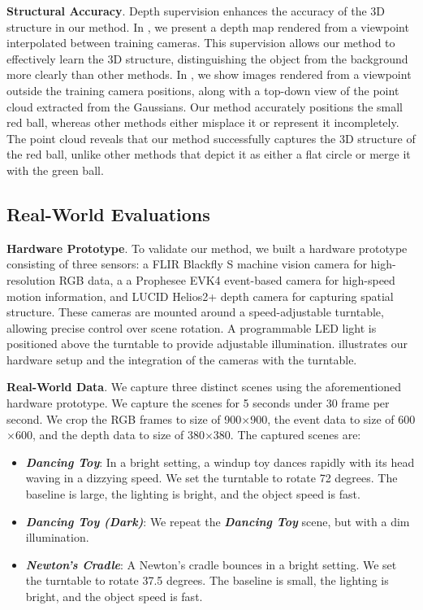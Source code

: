 

\noindent
\textbf{Structural Accuracy}. Depth supervision enhances the accuracy of the 3D structure in our method. In \figureautorefname{~\ref{fig:depth}}, we present a depth map rendered from a viewpoint interpolated between training cameras. This supervision allows our method to effectively learn the 3D structure, distinguishing the object from the background more clearly than other methods. In \figureautorefname{~\ref{fig:extrapolate}}, we show images rendered from a viewpoint outside the training camera positions, along with a top-down view of the point cloud extracted from the Gaussians. Our method accurately positions the small red ball, whereas other methods either misplace it or represent it incompletely. The point cloud reveals that our method successfully captures the 3D structure of the red ball, unlike other methods that depict it as either a flat circle or merge it with the green ball.


\subsection{Real-World Evaluations}
\label{real_world_exp}

\noindent
\textbf{Hardware Prototype}. To validate our method, we built a hardware prototype consisting of three sensors: a FLIR Blackfly S machine vision camera for high-resolution RGB data, a a Prophesee EVK4 event-based camera for high-speed motion information, and LUCID Helios2+ depth camera for capturing spatial structure. These cameras are mounted around a speed-adjustable turntable, allowing precise control over scene rotation. A programmable LED light is positioned above the turntable to provide adjustable illumination. \figureautorefname{~\ref{fig:hardware_setup}} illustrates our hardware setup and the integration of the cameras with the turntable.

\vspace{1mm}
\noindent
\textbf{Real-World Data}. We capture three distinct scenes using the aforementioned hardware prototype. We capture the scenes for 5 seconds under 30 frame per second. We crop the RGB frames to size of 900$\times$900, the event data to size of 600$\times$600, and the depth data to size of 380$\times$380. The captured scenes are:
\begin{itemize} 
    \item \textit{\textbf{Dancing Toy}}: In a bright setting, a windup toy dances rapidly with its head waving in a dizzying speed. We set the turntable to rotate 72 degrees. The baseline is large, the lighting is bright, and the object speed is fast. 
    \item \textit{\textbf{Dancing Toy (Dark)}}: We repeat the \textit{\textbf{Dancing Toy}} scene, but with a dim illumination.
    \item \textit{\textbf{Newton's Cradle}}: A Newton's cradle bounces in a bright setting. We set the turntable to rotate 37.5 degrees. The baseline is small, the lighting is bright, and the object speed is fast. 
\end{itemize}


